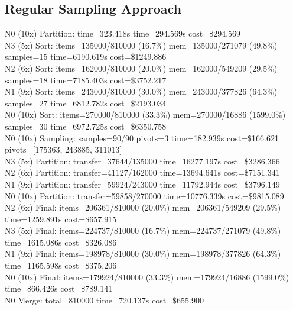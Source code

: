 \documentclass[]{interact}
\theoremstyle{plain}
\theoremstyle{definition}
\theoremstyle{remark}
\begin{document}
\subsection{Regular Sampling Approach}
N0 (10x) Partition: time=323.418\textmu s time=294.569\textmu s cost=\$294.569\\
N3 (5x) Sort: items=135000/810000 (16.7\%) mem=135000/271079 (49.8\%) samples=15 time=6190.619\textmu s cost=\$1249.886\\
N2 (6x) Sort: items=162000/810000 (20.0\%) mem=162000/549209 (29.5\%) samples=18 time=7185.403\textmu s cost=\$3752.217\\
N1 (9x) Sort: items=243000/810000 (30.0\%) mem=243000/377826 (64.3\%) samples=27 time=6812.782\textmu s cost=\$2193.034\\
N0 (10x) Sort: items=270000/810000 (33.3\%) mem=270000/16886 (1599.0\%) samples=30 time=6972.725\textmu s cost=\$6350.758\\
N0 (10x) Sampling: samples=90/90 pivots=3 time=182.939\textmu s cost=\$166.621 pivots=[175363, 243885, 311013]\\
N3 (5x) Partition: transfer=37644/135000 time=16277.197\textmu s cost=\$3286.366\\
N2 (6x) Partition: transfer=41127/162000 time=13694.641\textmu s cost=\$7151.341\\
N1 (9x) Partition: transfer=59924/243000 time=11792.944\textmu s cost=\$3796.149\\
N0 (10x) Partition: transfer=59858/270000 time=10776.339\textmu s cost=\$9815.089\\
N2 (6x) Final: items=206361/810000 (20.0\%) mem=206361/549209 (29.5\%) time=1259.891\textmu s cost=\$657.915\\
N3 (5x) Final: items=224737/810000 (16.7\%) mem=224737/271079 (49.8\%) time=1615.086\textmu s cost=\$326.086\\
N1 (9x) Final: items=198978/810000 (30.0\%) mem=198978/377826 (64.3\%) time=1165.598\textmu s cost=\$375.206\\
N0 (10x) Final: items=179924/810000 (33.3\%) mem=179924/16886 (1599.0\%) time=866.426\textmu s cost=\$789.141\\
N0 Merge: total=810000 time=720.137\textmu s cost=\$655.900
\end{document}
